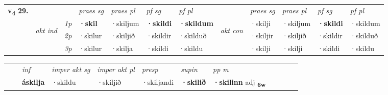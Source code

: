 \begin{tabular}{llllllllllll} \toprule
\multirow{4}{*}{{{\textbf{v{\textsubscript{4}}} \Large{\textbf{29.}}}}}  & &   &  \textit{praes sg}  & \textit{praes pl}  &\textit{ pf sg} & \textit{pf pl} &  &  \textit{praes sg}  & \textit{praes pl}  & \textit{pf sg} & \textit{pf pl } \\*
	\cmidrule{4-7} \cmidrule{9-12}
 & \multirow{3}{*}{\begin{turn}{90}\textit{akt ind}\end{turn}} & {\textit{1p}} & \textbf{·skil} & ·skiljum    & \textbf{·skildi} & \textbf{·skildum} & \multirow{3}{*}{\begin{turn}{90}\textit{akt con}\end{turn}} &·skilji & ·skiljum & \textbf{·skildi} & ·skildum\\*
& &  {\textit{2p}} &  ·skilur  & ·skiljið   & ·skildir & ·skilduð & & ·skiljir & ·skiljið & ·skildir & ·skilduð \\*
& &  {\textit{3p}} & ·skilur & ·skilja   & ·skildi & ·skildu & & ·skilji & ·skilji& ·skildi & ·skildu  \\*
\cmidrule{4-7} \cmidrule{9-12}
\end{tabular}


\begin{tabular}{llllllllllll}
 & & \textit{inf} & \textit{imper akt sg} & \textit{imper akt pl}   & \textit{presp} & \textit{supin}  & \textit{pp m}     \\*
  & & \textbf{áskilja} & ·skildu  & ·skiljið   & ·skiljandi &  \textbf{·skilið}  & \textbf{·skilinn} adj \textbf{\textsubscript{6w}} \\*
\cmidrule{1-12}
\end{tabular}



